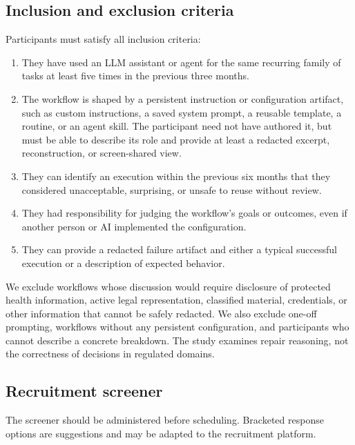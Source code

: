 \subsection{Inclusion and exclusion criteria}

Participants must satisfy all inclusion criteria:

\begin{enumerate}[leftmargin=*]
    \item They have used an LLM assistant or agent for the same recurring family
    of tasks at least five times in the previous three months.
    \item The workflow is shaped by a persistent instruction or configuration
    artifact, such as custom instructions, a saved system prompt, a reusable
    template, a routine, or an agent skill. The participant need not have
    authored it, but must be able to describe its role and provide at least a
    redacted excerpt, reconstruction, or screen-shared view.
    \item They can identify an execution within the previous six months that
    they considered unacceptable, surprising, or unsafe to reuse without
    review.
    \item They had responsibility for judging the workflow's goals or outcomes,
    even if another person or AI implemented the configuration.
    \item They can provide a redacted failure artifact and either a typical
    successful execution or a description of expected behavior.
\end{enumerate}

We exclude workflows whose discussion would require disclosure of protected
health information, active legal representation, classified material,
credentials, or other information that cannot be safely redacted. We also
exclude one-off prompting, workflows without any persistent configuration, and
participants who cannot describe a concrete breakdown. The study examines
repair reasoning, not the correctness of decisions in regulated domains.

\subsection{Recruitment screener}

The screener should be administered before scheduling. Bracketed response
options are suggestions and may be adapted to the recruitment platform.

